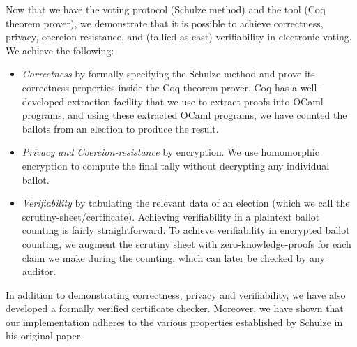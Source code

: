 Now that we have the voting protocol (Schulze method) and  the tool (Coq theorem prover), 
we demonstrate that it is possible to achieve correctness, privacy, coercion-resistance, and (tallied-as-cast) verifiability in 
electronic voting. We achieve the following:
\begin{itemize}
 \item \textit{Correctness} by formally specifying the Schulze method  and prove its correctness properties
  inside the Coq theorem prover. 
 Coq has a well-developed extraction facility that 
 we use to extract proofs into OCaml programs, and using these extracted OCaml programs, we 
 have counted the ballots from an election to produce the result. 
 \item \textit{Privacy and Coercion-resistance} by encryption. We use homomorphic encryption to compute the 
  final tally without decrypting any individual ballot. 
\item \textit{Verifiability} by tabulating the relevant data of an election (which we call the scrutiny-sheet/certificate).
   Achieving verifiability in a plaintext ballot counting is fairly straightforward. 
   To achieve verifiability in encrypted ballot counting, 
   we augment the scrutiny sheet with zero-knowledge-proofs for each claim we make during the 
   counting, which can  later be checked by any auditor.  
\end{itemize}



In addition to demonstrating correctness, privacy and verifiability, we have also developed a formally verified certificate 
checker. Moreover, we have shown that our implementation adheres to the various properties established by Schulze in 
his original paper. 

